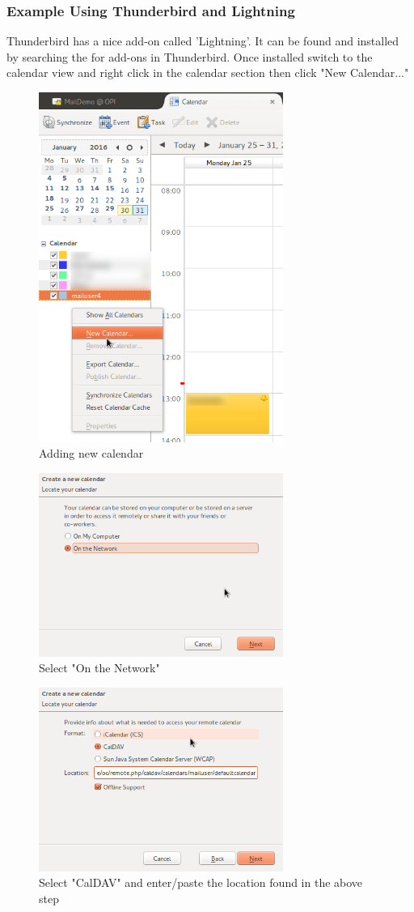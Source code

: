 \documentclass[12pt,a4paper,titlepage]{article}
\begin{document}
\subsubsection{Example Using Thunderbird and Lightning}
Thunderbird has a nice add-on called 'Lightning'.
It can be found and installed by searching the for add-ons in Thunderbird.
Once installed switch to the calendar view and right click in the calendar section then click "New Calendar..."
\begin{figure}[h!]
\centering
\includegraphics[width=8cm]{./img/External-clients-lightning0.png}
\caption{Adding new calendar}
\end{figure}
\begin{figure}[h!]
\centering
\includegraphics[width=8cm]{./img/External-clients-lightning1.png}
\caption{Select "On the Network"}
\end{figure}
\begin{figure}[h!]
\centering
\includegraphics[width=8cm]{./img/External-clients-lightning2.png}
\caption{Select "CalDAV" and enter/paste the location found in the above step}
\end{figure}
\end{document}
